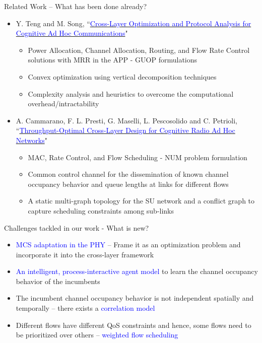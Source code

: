 \documentclass{beamer}
\begin{document}
\begin{frame}{Related Work – What has been done already?}
\begin{itemize}
  \item Y. Teng and M. Song, ``\href{http://ieeexplore.ieee.org/stamp/stamp.jsp?tp=&arnumber=7859326&isnumber=7859429}{\textcolor{blue}{Cross-Layer Optimization and Protocol Analysis for Cognitive Ad Hoc Communications}}"
  \begin{itemize}
      \item Power Allocation, Channel Allocation, Routing, and Flow Rate Control solutions with MRR in the APP - GUOP formulations
      \item Convex optimization using vertical decomposition techniques
      \item Complexity analysis and heuristics to overcome the computational overhead/intractability
  \end{itemize}
  \item A. Cammarano, F. L. Presti, G. Maselli, L. Pescosolido and C. Petrioli, ``\href{http://ieeexplore.ieee.org/stamp/stamp.jsp?tp=&arnumber=6881740&isnumber=7180482}{\textcolor{blue}{Throughput-Optimal Cross-Layer Design for Cognitive Radio Ad Hoc Networks}}"
  \begin{itemize}
      \item MAC, Rate Control, and Flow Scheduling - NUM problem formulation
      \item Common control channel for the dissemination of known channel occupancy behavior and queue lengths at links for different flows
      \item A static multi-graph topology for the SU network and a conflict graph to capture scheduling constraints among sub-links
  \end{itemize}
\end{itemize}
\vskip 1cm
\end{frame}
\begin{frame}{Challenges tackled in our work - What is new?}
\begin{itemize}
    \item \textcolor{blue}{MCS adaptation in the PHY} – Frame it as an optimization problem and incorporate it into the cross-layer framework
    \item \textcolor{blue}{An intelligent, process-interactive agent model} to learn the channel occupancy behavior of the incumbents
    \item The incumbent channel occupancy behavior is not independent spatially and temporally – there exists a \textcolor{blue}{correlation model}
    \item Different flows have different QoS constraints and hence, some flows need to be prioritized over others – \textcolor{blue}{weighted flow scheduling}
\end{itemize}
\vskip 1cm
\end{frame}
\end{document}

